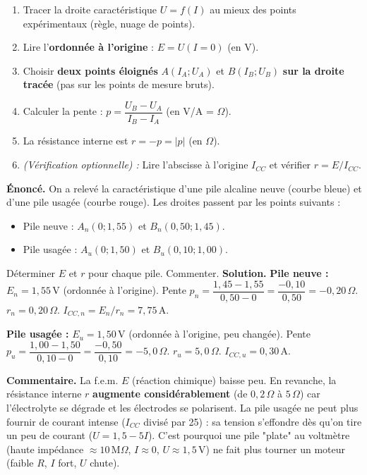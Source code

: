 \documentclass[11pt]{article}
\begin{document}
\begin{methode}
\begin{enumerate}
    \item Tracer la droite caractéristique $U = f(I)$ au mieux des points expérimentaux (règle, nuage de points).
    \item Lire l'\textbf{ordonnée à l'origine} : $E = U(I=0)$ (en V).
    \item Choisir \textbf{deux points éloignés} $A(I_A; U_A)$ et $B(I_B; U_B)$ \textbf{sur la droite tracée} (pas sur les points de mesure bruts).
    \item Calculer la pente : $p = \dfrac{U_B - U_A}{I_B - I_A}$ (en V/A = $\Omega$).
    \item La résistance interne est $r = -p = |p|$ (en $\Omega$).
    \item \emph{(Vérification optionnelle) :} Lire l'abscisse à l'origine $I_{CC}$ et vérifier $r = E / I_{CC}$.
\end{enumerate}
\end{methode}

\begin{exoresolu}
\textbf{Énoncé.} On a relevé la caractéristique d'une pile alcaline neuve (courbe bleue) et d'une pile usagée (courbe rouge). Les droites passent par les points suivants :
\begin{itemize}
    \item Pile neuve : $A_n(0; 1,55)$ et $B_n(0,50; 1,45)$.
    \item Pile usagée : $A_u(0; 1,50)$ et $B_u(0,10; 1,00)$.
\end{itemize}
Déterminer $E$ et $r$ pour chaque pile. Commenter.
\tcblower
\textbf{Solution.}
\textbf{Pile neuve :}
$E_n = 1,55\,\text{V}$ (ordonnée à l'origine).
Pente $p_n = \dfrac{1,45 - 1,55}{0,50 - 0} = \dfrac{-0,10}{0,50} = -0,20\,\Omega$.
$r_n = 0,20\,\Omega$.
$I_{CC,n} = E_n/r_n = 7,75\,\text{A}$.

\textbf{Pile usagée :}
$E_u = 1,50\,\text{V}$ (ordonnée à l'origine, peu changée).
Pente $p_u = \dfrac{1,00 - 1,50}{0,10 - 0} = \dfrac{-0,50}{0,10} = -5,0\,\Omega$.
$r_u = 5,0\,\Omega$.
$I_{CC,u} = 0,30\,\text{A}$.

\textbf{Commentaire.}
La f.e.m. $E$ (réaction chimique) baisse peu. En revanche, la résistance interne $r$ \textbf{augmente considérablement} (de $0,2\,\Omega$ à $5\,\Omega$) car l'électrolyte se dégrade et les électrodes se polarisent. La pile usagée ne peut plus fournir de courant intense ($I_{CC}$ divisé par 25) : sa tension s'effondre dès qu'on tire un peu de courant ($U = 1,5 - 5I$). C'est pourquoi une pile "plate" au voltmètre (haute impédance $\approx 10\,\text{M}\Omega$, $I\approx 0$, $U\approx 1,5\,\text{V}$) ne fait plus tourner un moteur (faible $R$, $I$ fort, $U$ chute).
\end{exoresolu}
\end{document}
